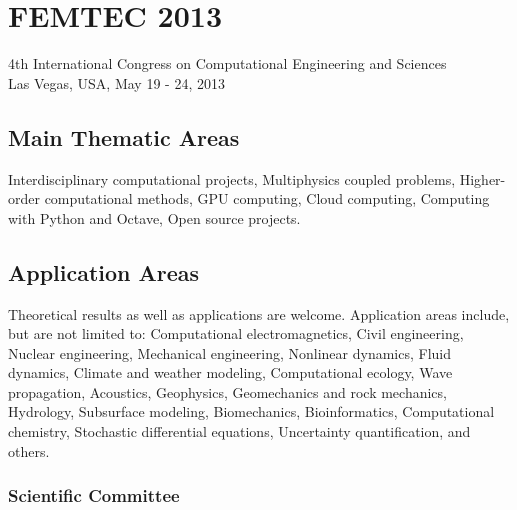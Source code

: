 \documentclass[article, A4, 11pt]{llncs}%
\begin{document}
\chapter*{\huge FEMTEC 2013}
\vspace{-5mm}
\normalsize
\begin{center}
4th International Congress on Computational Engineering and Sciences\\ Las Vegas, USA, May 19 - 24, 2013
\end{center}
\vspace{-3mm}

\section*{Main Thematic Areas}%

Interdisciplinary computational projects, Multiphysics coupled problems, Higher-order computational methods, GPU computing, Cloud computing, Computing with Python and Octave, Open source projects.


\section*{Application Areas}%

Theoretical results as well as applications are welcome. Application areas include, but are not limited to: Computational electromagnetics, Civil engineering, Nuclear engineering, Mechanical engineering, Nonlinear dynamics, Fluid dynamics, Climate and weather modeling, Computational ecology, Wave propagation, Acoustics, Geophysics, Geomechanics and rock mechanics, Hydrology, Subsurface modeling, Biomechanics, Bioinformatics, Computational chemistry, Stochastic differential equations, Uncertainty quantification, and others.

\subsection*{Scientific Committee}%

\end{document}
